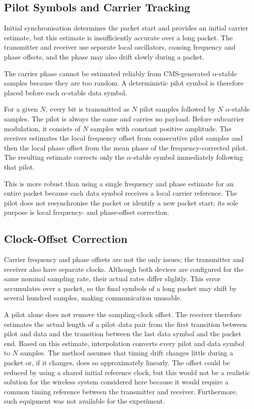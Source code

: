\documentclass[a4paper, 12pt, openany]{book}
\begin{document}
\subsection{Pilot Symbols and Carrier Tracking}

Initial synchronisation determines the packet start and provides an initial carrier estimate, but this estimate is insufficiently accurate over a long packet. The transmitter and receiver use separate local oscillators, causing frequency and phase offsets, and the phase may also drift slowly during a packet.

The carrier phase cannot be estimated reliably from CMS-generated $\alpha$-stable samples because they are too random. A deterministic pilot symbol is therefore placed before each $\alpha$-stable data symbol.

For a given $N$, every bit is transmitted as $N$ pilot samples followed by $N$ $\alpha$-stable samples. The pilot is always the same and carries no payload. Before subcarrier modulation, it consists of $N$ samples with constant positive amplitude. The receiver estimates the local frequency offset from consecutive pilot samples and then the local phase offset from the mean phase of the frequency-corrected pilot. The resulting estimate corrects only the $\alpha$-stable symbol immediately following that pilot.

This is more robust than using a single frequency and phase estimate for an entire packet because each data symbol receives a local carrier reference. The pilot does not resynchronise the packet or identify a new packet start; its sole purpose is local frequency- and phase-offset correction.

\subsection{Clock-Offset Correction}

Carrier frequency and phase offsets are not the only issues; the transmitter and receiver also have separate clocks. Although both devices are configured for the same nominal sampling rate, their actual rates differ slightly. This error accumulates over a packet, so the final symbols of a long packet may shift by several hundred samples, making communication unusable.

A pilot alone does not remove the sampling-clock offset. The receiver therefore estimates the actual length of a pilot--data pair from the first transition between pilot and data and the transition between the last data symbol and the packet end. Based on this estimate, interpolation converts every pilot and data symbol to $N$ samples. The method assumes that timing drift changes little during a packet or, if it changes, does so approximately linearly. The offset could be reduced by using a shared initial reference clock, but this would not be a realistic solution for the wireless system considered here because it would require a common timing reference between the transmitter and receiver. Furthermore, such equipment was not available for the experiment.
\end{document}
